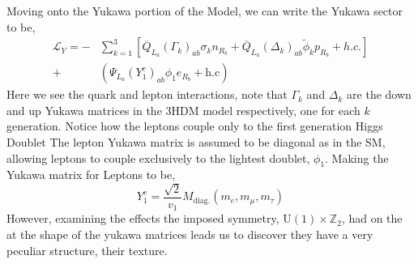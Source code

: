Moving onto the Yukawa portion of the Model, we can write the Yukawa sector to be,
\begin{equation} \label{eq:3HDM_Yuk} \begin{split} 
\mathcal{L}_Y = - & \sum_{k=1}^3 \left[ \overline{Q}_{L_a} \left( \Gamma_k \right)_{ab} \sigma_k n_{R_b} + \overline{Q}_{L_a} \left( \Delta_k \right)_{ab} \tilde{\phi}_k p_{R_b} + h.c.  \right] \\ + & \left( \Psi_{L_a} \left( Y^e_1 \right)_{ab} \phi_1 e_{R_b} + \text{h.c} \right)
\end{split} \end{equation}   
Here we see the quark and lepton interactions, note that $\Gamma_k$ and $\Delta_k$ are the down and up Yukawa matrices in the 3HDM model respectively, one for each $k$ generation. Notice how the leptons couple only to the first generation Higgs Doublet  
%
%
The lepton Yukawa matrix is assumed to be diagonal as in the SM, allowing leptons to couple exclusively to the lightest doublet, $\phi_1$. Making the Yukawa matrix for Leptons to be, 
\begin{equation}
Y^e_1 = \frac{\sqrt{2}}{v_1} M_{\text{diag.}}\left( m_e , m_\mu , m_\tau \right)
\end{equation} 
However, examining the effects the imposed symmetry, $\mathrm{U}(1)\times\mathbb{Z}_2$, had on the at the shape of the yukawa matrices leads us to discover they have a very peculiar structure, their texture.  
%
%
